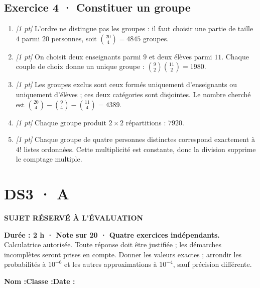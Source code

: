 \subsection*{Exercice 4 · Constituer un groupe}\begin{enumerate}

\item \textit{[1 pt]} L'ordre ne distingue pas les groupes : il faut choisir une partie de taille $4$ parmi $20$ personnes, soit $\binom{20}4=4845$ groupes.

\item \textit{[1 pt]} On choisit deux enseignants parmi $9$ et deux élèves parmi $11$. Chaque couple de choix donne un unique groupe : $\binom{9}2\binom{11}2=1980$.

\item \textit{[1 pt]} Les groupes exclus sont ceux formés uniquement d'enseignants ou uniquement d'élèves ; ces deux catégories sont disjointes. Le nombre cherché est $\binom{20}4-\binom{9}4-\binom{11}4=4389$.

\item \textit{[1 pt]} Chaque groupe produit $2\times2$ répartitions : $7920$.

\item \textit{[1 pt]} Chaque groupe de quatre personnes distinctes correspond exactement à $4!$ listes ordonnées. Cette multiplicité est constante, donc la division supprime le comptage multiple.

\end{enumerate}

\fi

\ifprof

\clearpage{}\label{sujet:4-3}

\section*{DS3 · A}

{\sffamily\bfseries\color{amber}SUJET RÉSERVÉ À L'ÉVALUATION\par}

\textbf{Durée : 2 h · Note sur 20 · Quatre exercices indépendants.}\\Calculatrice autorisée. Toute réponse doit être justifiée ; les démarches incomplètes seront prises en compte. Donner les valeurs exactes ; arrondir les probabilités à $10^{-6}$ et les autres approximations à $10^{-4}$, sauf précision différente.

\smallskip\textbf{Nom :}\enspace\dotfill\quad\textbf{Classe :}\enspace\dotfill\quad\textbf{Date :}\enspace\dotfill

